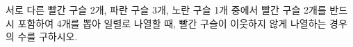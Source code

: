 서로 다른 빨간 구슬 2개, 파란 구슬 3개, 노란 구슬 1개 중에서 빨간 구슬 2개를 반드시 포함하여 4개를 뽑아 일렬로 나열할 때, 빨간 구슬이 이웃하지 않게 나열하는 경우의 수를 구하시오.
